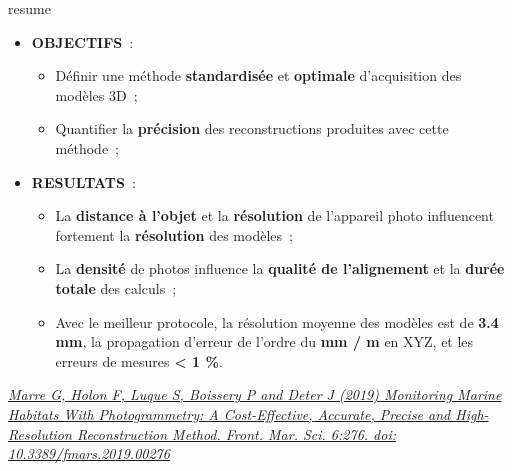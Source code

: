 \setlength{\fboxsep}{8pt}
\setlength{\fboxrule}{0pt}
\begin{center}
\begin{colbox}{resume}
  \vspace{-2pt}
{\color{textresume}\small
\begin{itemize}[leftmargin=0in]\itemsep3pt
\item \textbf{OBJECTIFS}~:
    \begin{itemize}
      \item Définir une méthode \textbf{standardisée} et \textbf{optimale} d'acquisition des modèles 3D~;
      \item Quantifier la \textbf{précision} des reconstructions produites avec cette méthode~;
    \end{itemize}
\item \textbf{RESULTATS}~:
    \begin{itemize}
      \item La \textbf{distance à l'objet} et la \textbf{résolution} de l'appareil photo influencent fortement la \textbf{résolution} des modèles~;
      \item La \textbf{densité} de photos influence la \textbf{qualité de l'alignement} et la \textbf{durée totale} des calculs~;
      \item Avec le meilleur protocole, la résolution moyenne des modèles est de \textbf{3.4 mm}, la propagation d'erreur de l'ordre du \textbf{mm / m} en XYZ, et les erreurs de mesures \textbf{< 1 \%}.
    \end{itemize}
\end{itemize}
}
\vspace{-2pt}
\end{colbox}
\end{center}

\clearpage

\normalsize
\medskip


\noindent\href{https://doi.org/10.3389/fmars.2019.00276}{\textit{Marre G, Holon F, Luque S, Boissery P and Deter J (2019) Monitoring Marine Habitats With Photogrammetry: A Cost-Effective, Accurate, Precise and High-Resolution Reconstruction Method. Front. Mar. Sci. 6:276. doi: 10.3389/fmars.2019.00276}}

